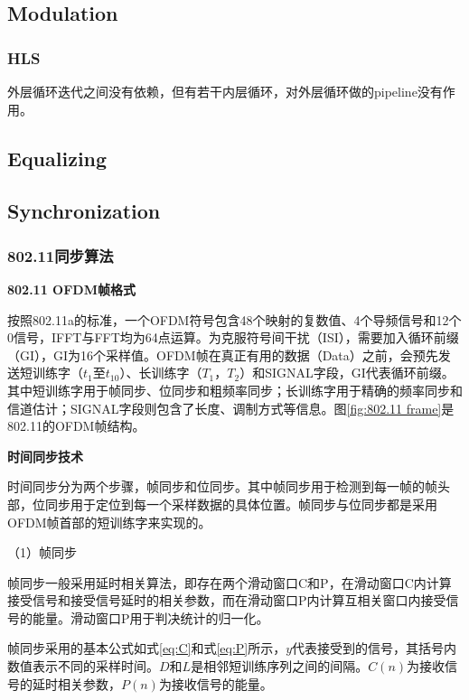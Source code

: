 \documentclass[titlepage]{article}
\numberwithin{figure}{section}
\numberwithin{equation}{section}
\begin{document}
\subsection{Modulation}

\subsubsection{HLS}

外层循环迭代之间没有依赖，但有若干内层循环，对外层循环做的pipeline没有作用。

\subsection{Equalizing}

\subsection{Synchronization}

\subsubsection{802.11同步算法}

\textbf{802.11 OFDM帧格式}

按照802.11a的标准，一个OFDM符号包含48个映射的复数值、4个导频信号和12个0信号，IFFT与FFT均为64点运算。为克服符号间干扰（ISI），需要加入循环前缀（GI），GI为16个采样值。OFDM帧在真正有用的数据（Data）之前，会预先发送短训练字（$t_{1}$至$t_{10}$）、长训练字（$T_{1}$，$T_{2}$）和SIGNAL字段，GI代表循环前缀。其中短训练字用于帧同步、位同步和粗频率同步；长训练字用于精确的频率同步和信道估计；SIGNAL字段则包含了长度、调制方式等信息。图\ref{fig:802.11 frame}是802.11的OFDM帧结构。

\textbf{时间同步技术}

时间同步分为两个步骤，帧同步和位同步。其中帧同步用于检测到每一帧的帧头部，位同步用于定位到每一个采样数据的具体位置。帧同步与位同步都是采用OFDM帧首部的短训练字来实现的。

（1）帧同步

帧同步一般采用延时相关算法，即存在两个滑动窗口C和P，在滑动窗口C内计算接受信号和接受信号延时的相关参数，而在滑动窗口P内计算互相关窗口内接受信号的能量。滑动窗口P用于判决统计的归一化。

帧同步采用的基本公式如式\ref{eq:C}和式\ref{eq:P}所示，$y$代表接受到的信号，其括号内数值表示不同的采样时间。$D$和$L$是相邻短训练序列之间的间隔。$C(n)$为接收信号的延时相关参数，$P(n)$为接收信号的能量。
\end{document}
